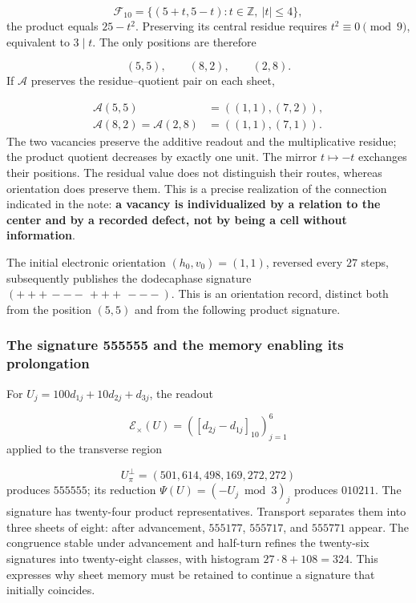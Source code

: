 \[
\mathcal F_{10}=\{(5+t,5-t):t\in\mathbb Z,\ |t|\leq4\},
\]
the product equals \(25-t^2\). Preserving its central residue requires \(t^2\equiv0\pmod9\), equivalent to \(3\mid t\). The only positions are therefore

\[
(5,5),\qquad(8,2),\qquad(2,8).
\]
If \(\mathcal A\) preserves the residue–quotient pair on each sheet,

\[
\begin{aligned}
\mathcal A(5,5)&=((1,1),(7,2)),\\
\mathcal A(8,2)=\mathcal A(2,8)&=((1,1),(7,1)).
\end{aligned}
\]
The two vacancies preserve the additive readout and the multiplicative residue; the product quotient decreases by exactly one unit. The mirror \(t\mapsto-t\) exchanges their positions. The residual value does not distinguish their routes, whereas orientation does preserve them. This is a precise realization of the connection indicated in the note: \textbf{a vacancy is individualized by a relation to the center and by a recorded defect, not by being a cell without information}.

The initial electronic orientation \((h_0,v_0)=(1,1)\), reversed every \(27\) steps, subsequently publishes the dodecaphase signature \((+++\,---\,+++\,---)\). This is an orientation record, distinct both from the position \((5,5)\) and from the following product signature.

\subsubsection*{The signature 555555 and the memory enabling its prolongation}
For \(U_j=100d_{1j}+10d_{2j}+d_{3j}\), the readout

\[
\mathcal E_\times(U)=([d_{2j}-d_{1j}]_{10})_{j=1}^{6}
\]
applied to the transverse region

\[
U_\pi^\perp=(501,614,498,169,272,272)
\]
produces \(555555\); its reduction \(\Psi(U)=(-U_j\bmod3)_j\) produces \(010211\). The signature has twenty-four product representatives. Transport separates them into three sheets of eight: after advancement, \(555177\), \(555717\), and \(555771\) appear. The congruence stable under advancement and half-turn refines the twenty-six signatures into twenty-eight classes, with histogram \(27\cdot8+108=324\). This expresses why sheet memory must be retained to continue a signature that initially coincides.


